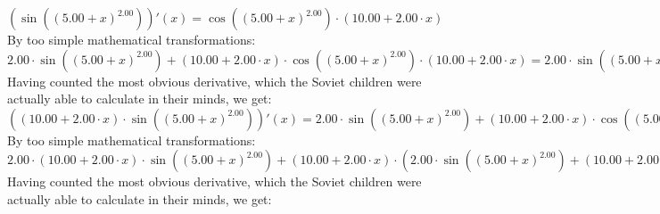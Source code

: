 \documentclass{article}
\begin{document}
$( \sin {\left({\left({{5.00} + {x}}\right) ^ {2.00}}\right)} )'(x) = { \cos {\left({\left({{5.00} + {x}}\right) ^ {2.00}}\right)}  \cdot \left({{10.00} + {{2.00} \cdot {x}}}\right)}$\newline
\newline
By too simple mathematical transformations:
 ${{{2.00} \cdot  \sin {\left({\left({{5.00} + {x}}\right) ^ {2.00}}\right)} } + {\left({{10.00} + {{2.00} \cdot {x}}}\right) \cdot { \cos {\left({\left({{5.00} + {x}}\right) ^ {2.00}}\right)}  \cdot \left({{10.00} + {{2.00} \cdot {x}}}\right)}}} = {{{2.00} \cdot  \sin {\left({\left({{5.00} + {x}}\right) ^ {2.00}}\right)} } + {\left({{10.00} + {{2.00} \cdot {x}}}\right) \cdot { \cos {\left({\left({{5.00} + {x}}\right) ^ {2.00}}\right)}  \cdot \left({{10.00} + {{2.00} \cdot {x}}}\right)}}}$ 
 \newline
 \newline 
Having counted the most obvious derivative, which the Soviet children were actually able to calculate in their minds, we get:
$({\left({{10.00} + {{2.00} \cdot {x}}}\right) \cdot  \sin {\left({\left({{5.00} + {x}}\right) ^ {2.00}}\right)} })'(x) = {{{2.00} \cdot  \sin {\left({\left({{5.00} + {x}}\right) ^ {2.00}}\right)} } + {\left({{10.00} + {{2.00} \cdot {x}}}\right) \cdot { \cos {\left({\left({{5.00} + {x}}\right) ^ {2.00}}\right)}  \cdot \left({{10.00} + {{2.00} \cdot {x}}}\right)}}}$\newline
\newline
By too simple mathematical transformations:
 ${{{2.00} \cdot {\left({{10.00} + {{2.00} \cdot {x}}}\right) \cdot  \sin {\left({\left({{5.00} + {x}}\right) ^ {2.00}}\right)} }} + {\left({{10.00} + {{2.00} \cdot {x}}}\right) \cdot \left({{{2.00} \cdot  \sin {\left({\left({{5.00} + {x}}\right) ^ {2.00}}\right)} } + {\left({{10.00} + {{2.00} \cdot {x}}}\right) \cdot { \cos {\left({\left({{5.00} + {x}}\right) ^ {2.00}}\right)}  \cdot \left({{10.00} + {{2.00} \cdot {x}}}\right)}}}\right)}} = {{{2.00} \cdot {\left({{10.00} + {{2.00} \cdot {x}}}\right) \cdot  \sin {\left({\left({{5.00} + {x}}\right) ^ {2.00}}\right)} }} + {\left({{10.00} + {{2.00} \cdot {x}}}\right) \cdot \left({{{2.00} \cdot  \sin {\left({\left({{5.00} + {x}}\right) ^ {2.00}}\right)} } + {\left({{10.00} + {{2.00} \cdot {x}}}\right) \cdot { \cos {\left({\left({{5.00} + {x}}\right) ^ {2.00}}\right)}  \cdot \left({{10.00} + {{2.00} \cdot {x}}}\right)}}}\right)}}$ 
 \newline
 \newline 
Having counted the most obvious derivative, which the Soviet children were actually able to calculate in their minds, we get:
\end{document}
